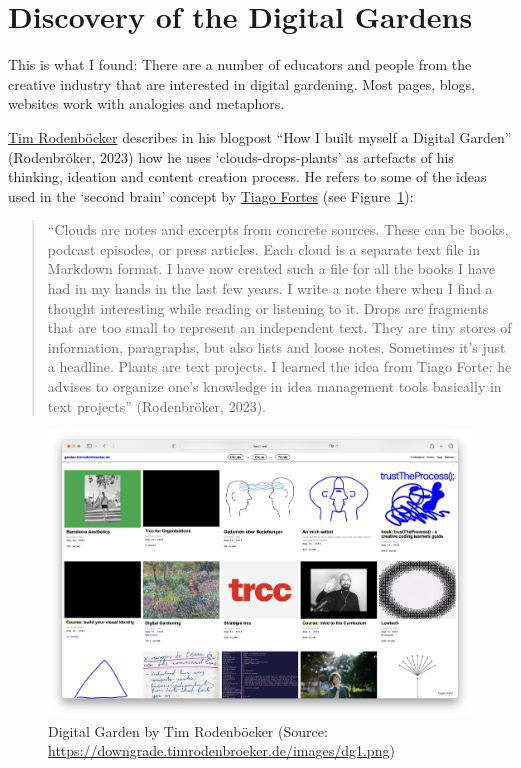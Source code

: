 \documentclass[
]{agujournal2019}
\begin{document}
\section{Discovery of the Digital
Gardens}\label{discovery-of-the-digital-gardens}

This is what I found: There are a number of educators and people from
the creative industry that are interested in digital gardening. Most
pages, blogs, websites work with analogies and metaphors.

\href{https://downgrade.timrodenbroeker.de/posts/digital-garden/}{Tim
Rodenböcker} describes in his blogpost ``How I built myself a Digital
Garden'' (Rodenbröker, 2023) how he uses `clouds-drops-plants' as
artefacts of his thinking, ideation and content creation process. He
refers to some of the ideas used in the `second brain' concept by
\href{https://fortelabs.com/}{Tiago Fortes} (see Figure~\ref{fig-tim}):

\begin{quote}
``Clouds are notes and excerpts from concrete sources. These can be
books, podcast episodes, or press articles. Each cloud is a separate
text file in Markdown format. I have now created such a file for all the
books I have had in my hands in the last few years. I write a note there
when I find a thought interesting while reading or listening to it.
Drops are fragments that are too small to represent an independent text.
They are tiny stores of information, paragraphs, but also lists and
loose notes. Sometimes it's just a headline. Plants are text projects. I
learned the idea from Tiago Forte: he advises to organize one's
knowledge in idea management tools basically in text projects''
(Rodenbröker, 2023).
\end{quote}

\begin{figure}

\includegraphics[width=8.33333in,height=\textheight]{images/dg1.png}

\caption{\label{fig-tim}Digital Garden by Tim Rodenböcker (Source:
\url{https://downgrade.timrodenbroeker.de/images/dg1.png})}

\end{figure}%
\end{document}
